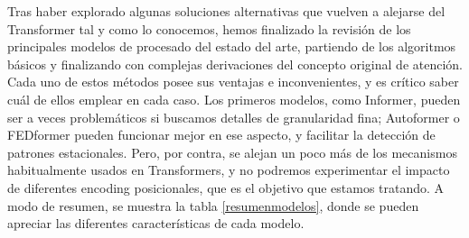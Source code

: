 {Tras haber explorado algunas soluciones alternativas que vuelven a alejarse del Transformer tal y como lo conocemos, hemos finalizado la revisión de los principales modelos de procesado del estado del arte, partiendo de los algoritmos básicos y finalizando con complejas derivaciones del concepto original de atención.\\

Cada uno de estos métodos posee sus ventajas e inconvenientes, y es crítico saber cuál de ellos emplear en cada caso. Los primeros modelos, como Informer, pueden ser a veces problemáticos si buscamos detalles de granularidad fina; Autoformer o FEDformer pueden funcionar mejor en ese aspecto, y facilitar la detección de patrones estacionales. Pero, por contra, se alejan un poco más de los mecanismos habitualmente usados en Transformers, y no podremos experimentar el impacto de diferentes encoding posicionales, que es el objetivo que estamos tratando.
A modo de resumen, se muestra la tabla \ref{resumenmodelos}, donde se pueden apreciar las diferentes características de cada modelo.\\

}

